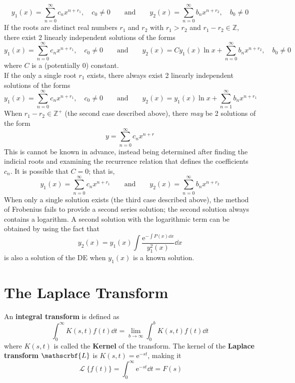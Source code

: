 \documentclass[12pt, A4]{article}
\newcommand{\en}{\text{e}}
\newcommand{\Z}{\mathbb{Z}}
\DeclareMathOperator{\Ell}{\mathscr{L}}
\begin{document}
					\[
						y_1(x) = \sum_{n = 0}^\infty c_nx^{n + r_1}, \quad c_0 \ne 0 \qquad \text{and} \qquad 
						y_2(x) = \sum_{n = 0}^\infty b_nx^{n + r_2}, \quad b_0 \ne 0
					\]
					If the roots are distinct real numbers \(r_1\) and \(r_2\) with \(r_1 > r_2\) and \(r_1 - r_2 \in \Z\), there exist 2 linearly independent solutions of the forms
					\[
						y_1(x) = \sum_{n = 0}^\infty c_nx^{n + r_1}, \quad c_0 \ne 0 \qquad \text{and} \qquad
						y_2(x) = Cy_1(x)\ln x + \sum_{n = 0}^\infty b_nx^{n + r_2}, \quad b_0 \ne 0
					\]
					where \(C\) is a (potentially 0) constant. \\
					If the only a single root \(r_1\) exists, there always exist 2 linearly independent solutions of the forms
					\[
						y_1(x) = \sum_{n = 0}^\infty c_nx^{n + r_1}, \quad c_0 \ne 0 \qquad \text{and} \qquad
						y_2(x) = y_1(x)\ln x + \sum_{n = 1}^\infty b_nx^{n + r_1}
					\]
				When \(r _1 - r_2 \in \Z^+\) (the second case described above), there \textit{may} be 2 solutions of the form
					\[y = \sum_{n = 0}^\infty c_nx^{n + r}\]
					This is cannot be known in advance, instead being determined after finding the indicial roots and examining the recurrence relation that defines the coefficients \(c_n\). It is possible that \(C = 0\); that is,
					\[
						y_1(x) = \sum_{n = 0}^\infty c_nx^{n + r_1} \qquad \text{and} \qquad
						y_2(x) = \sum_{n = 0}^\infty b_nx^{n + r_2}
					\]
					When only a single solution exists (the third case described above), the method of Frobenius fails to provide a second series solution; the second solution always contains a logarithm. A second solution with the logarithmic term can be obtained by using the fact that
					\[y_2(x) = y_1(x) \int\frac{\en^{-\int P(x)\dd{x}}}{y_1^2(x)}\dd{x}\]
					is also a solution of the DE when \(y_1(x)\) is a known solution.
	\section{The Laplace Transform}
		An \textbf{integral transform} is defined as
			\[\int_0^\infty K(s, t)f(t) \dd{t} = \lim_{b \to \infty}\int_0^b K(s, t)f(t) \dd{t}\]
			where \(K(s, t)\) is called the \textbf{Kernel} of the transform. The kernel of the \textbf{Laplace transform \(\mathscrbf{L}\)} is \(K(s, t) = \en^{-st}\), making it
				\[\Ell\{f(t)\} = \int_0^\infty \en^{-st}\dd{t} = F(s)\]
\end{document}

